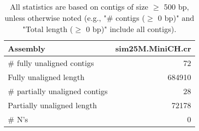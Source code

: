 \documentclass[12pt,a4paper]{article}
\begin{document}
\begin{table}[ht]
\begin{center}
\caption{All statistics are based on contigs of size $\geq$ 500 bp, unless otherwise noted (e.g., "\# contigs ($\geq$ 0 bp)" and "Total length ($\geq$ 0 bp)" include all contigs).}
\begin{tabular}{|l*{1}{|r}|}
\hline
Assembly & sim25M.MiniCH.cr \\ \hline
\# fully unaligned contigs & 72 \\ \hline
Fully unaligned length & 684910 \\ \hline
\# partially unaligned contigs & 28 \\ \hline
Partially unaligned length & 72178 \\ \hline
\# N's & 0 \\ \hline
\end{tabular}
\end{center}
\end{table}
\end{document}
